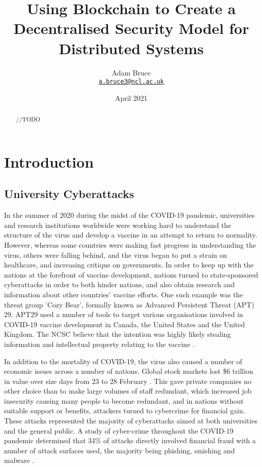 \documentclass[a4paper]{report}
\title{Using Blockchain to Create a Decentralised Security Model for Distributed Systems}
\date{April 2021}
\author{Adam Bruce \\ \texttt{\href{mailto:a.bruce3@ncl.ac.uk}{a.bruce3@ncl.ac.uk}}}
\begin{document}
\maketitle

\begin{abstract}
//TODO
\end{abstract}

\tableofcontents

\newpage

\chapter{Introduction}
\section{University Cyberattacks}
In the summer of 2020 during the midst of the COVID-19 pandemic, universities and research institutions worldwide were working hard to understand the structure of the virus and develop a vaccine in an attempt to return to normality. However, whereas some countries were making fast progress in understanding the virus, others were falling behind, and the virus began to put a strain on healthcare, and increasing critique on governments. In order to keep up with the nations at the forefront of vaccine development, nations turned to state-sponsored cyberattacks in order to both hinder nations, and also obtain research and information about other countries' vaccine efforts. One such example was the threat group 'Cozy Bear', formally known as Advanced Persistent Threat (APT) 29. APT29 used a number of tools to target various organisations involved in COVID-19 vaccine development in Canada, the United States and the United Kingdom. The NCSC believe that the intention was highly likely stealing information and intellectual property relating to the vaccine \cite{APT29}.

In addition to the mortality of COVID-19, the virus also caused a number of economic issues across a number of nations. Global stock markets lost \$6 trillion in value over size days from 23 to 28 February \cite{covspill}. This gave private companies no other choice than to make large volumes of staff redundant, which increased job insecurity causing many people to become redundant, and in nations without suitable support or benefits, attackers turned to cybercrime for financial gain. These attacks represented the majority of cyberattacks aimed at both universities and the general public. A study of cyber-crime throughout the COVID-19 pandemic determined that 34\% of attacks directly involved financial fraud with a number of attack surfaces used, the majority being phishing, smishing and malware \cite{diffattack}.
\end{document}
